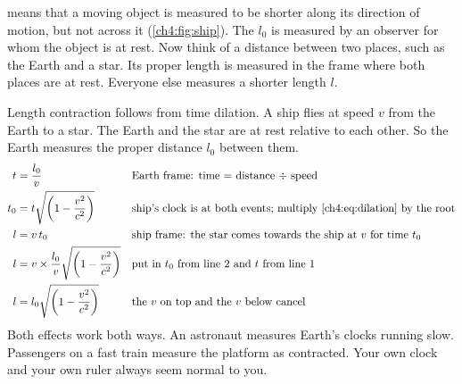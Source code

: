 \begin{sidebyside}[0.46]
  \centering
  \label{ch4:fig:ship}
\nextside
   means that a moving object is measured to be shorter along its
  direction of motion, but not across it (\cref{ch4:fig:ship}). The  $l_0$
  is measured by an observer for whom the object is at rest. Now think of a distance between two
  places, such as the Earth and a star. Its proper length is measured in the frame where both
  places are at rest. Everyone else measures a shorter length $l$.
\end{sidebyside}

Length contraction follows from time dilation. A ship flies at speed $v$ from the Earth to a
star. The Earth and the star are at rest relative to each other. So the Earth measures the
proper distance $l_0$ between them.
\begin{align}
  t &= \frac{l_0}{v} && \text{Earth frame: time $=$ distance $\div$ speed}\notag\\
  t_0 &= t\sqrt{\left(1 - \frac{v^2}{c^2}\right)}
    && \text{ship's clock is at both events; multiply \cref{ch4:eq:dilation} by the root}\notag\\
  l &= v\,t_0 && \text{ship frame: the star comes towards the ship at $v$ for time $t_0$}\notag\\
  l &= v \times \frac{l_0}{v}\sqrt{\left(1 - \frac{v^2}{c^2}\right)}
    && \text{put in $t_0$ from line 2 and $t$ from line 1}\notag\\
  l &= l_0\sqrt{\left(1 - \frac{v^2}{c^2}\right)}
    && \text{the $v$ on top and the $v$ below cancel}\label{ch4:eq:contraction}
\end{align}
Both effects work both ways. An astronaut measures Earth's clocks running slow. Passengers on a
fast train measure the platform as contracted. Your own clock and your own ruler always seem
normal to you.

